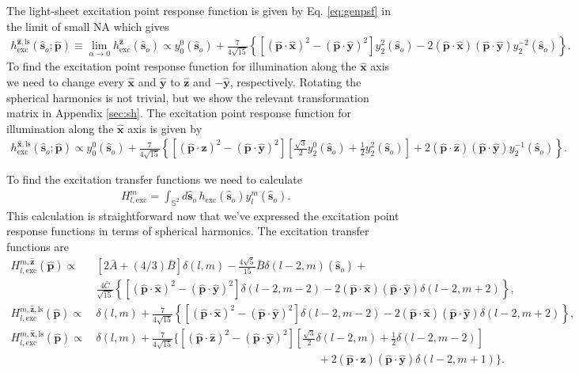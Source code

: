 \documentclass[11pt]{article}
\providecommand{\so}[1]{\mathbf{\hat{s}}_o}
\providecommand{\mh}[1]{\mathbf{\hat{#1}}}
\begin{document}
The light-sheet excitation point response function is given by Eq.
\ref{eq:genpsf} in the limit of small NA which gives
\begin{align}
  h^{\mh{z}, \text{ls}}_{\text{exc}}(\so{}; \mh{p}) \equiv \lim_{\alpha \rightarrow 0} h^{\mh{z}}_{\text{exc}}(\so{}) \propto y_0^0(\so{}) + \frac{7}{4\sqrt{15}}\left\{[(\mh{p}\cdot\mh{x})^2 - (\mh{p}\cdot\mh{y})^2]y_2^2(\so{}) - 2(\mh{p}\cdot\mh{x})(\mh{p}\cdot\mh{y})y_2^{-2}(\so{})\right\}.
\end{align}
To find the excitation point response function for illumination along the
$\mh{x}$ axis we need to change every $\mh{x}$ and $\mh{y}$ to $\mh{z}$ and
$-\mh{y}$, respectively. Rotating the spherical harmonics is not trivial,
but we show the relevant transformation matrix in Appendix \ref{sec:sh}. The
excitation point response function for illumination along the $\mh{x}$ axis is
given by
\begin{align}
  h^{\mh{x}, \text{ls}}_{\text{exc}}(\so{}; \mh{p}) \propto y_0^0(\so{}) + \frac{7}{4\sqrt{15}}\left\{[(\mh{p}\cdot\mh{z})^2 - (\mh{p}\cdot\mh{y})^2]\left[\frac{\sqrt{3}}{2}y_2^0(\so{}) + \frac{1}{2}y_2^2(\so{})\right] + 2(\mh{p}\cdot\mh{z})(\mh{p}\cdot\mh{y})y_2^{-1}(\so{})\right\}.
\end{align}

To find the excitation transfer functions we need to calculate
\begin{align}
  H_{l, \text{exc}}^m = \int_{\mathbb{S}^2} d\so{}\, h_{\text{exc}}(\so{}) y_l^m(\so{}).
\end{align}
This calculation is straightforward now that we've expressed the excitation
point response functions in terms of spherical harmonics. The excitation
transfer functions are
\begin{align}
  H^{m,\mh{z}}_{l,\text{exc}}(\mh{p}) \propto\, &[2\bar{A} + (4/3)\bar{B}]\delta(l, m) - \frac{4\sqrt{5}}{15}\bar{B}\delta(l-2, m)(\so{}) + \nonumber\\ &\frac{4\bar{C}}{\sqrt{15}}\left\{[(\mh{p}\cdot\mh{x})^2 - (\mh{p}\cdot\mh{y})^2]\delta(l-2, m-2) - 2(\mh{p}\cdot\mh{x})(\mh{p}\cdot\mh{y})\delta(l-2, m+2)\right\},\\
  H^{m,\mh{z}, \text{ls}}_{l,\text{exc}}(\mh{p}) \propto\, &\delta(l,m) + \frac{7}{4\sqrt{15}}\left\{[(\mh{p}\cdot\mh{x})^2 - (\mh{p}\cdot\mh{y})^2]\delta(l-2,m-2) - 2(\mh{p}\cdot\mh{x})(\mh{p}\cdot\mh{y})\delta(l-2, m+2)\right\},\\
  H^{m,\mh{x}, \text{ls}}_{l, \text{exc}}(\mh{p}) \propto\, &\delta(l,m) + \frac{7}{4\sqrt{15}}\Bigg\{[(\mh{p}\cdot\mh{z})^2 - (\mh{p}\cdot\mh{y})^2]\left[\frac{\sqrt{3}}{2}\delta(l-2,m) + \frac{1}{2}\delta(l-2, m-2)\right]\nonumber\\ &\hspace{20em}+ 2(\mh{p}\cdot\mh{z})(\mh{p}\cdot\mh{y})\delta(l-2, m+1)\Bigg\}.                                                              
\end{align}
\end{document}
